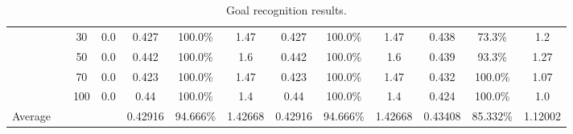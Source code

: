 \documentclass[letterpaper]{article}
\begin{document}
\begin{table*}[]
\begin{tabular}{|c|c|cc|ccc|ccc|ccc|}
	\\ & & 30	 & 0.0

		& 0.427 & 100.0\% & 1.47 	 

		& 0.427 & 100.0\% & 1.47 	 

		& 0.438 & 73.3\% & 1.2 	 

	\\ & & 50	 & 0.0

		& 0.442 & 100.0\% & 1.6 	 

		& 0.442 & 100.0\% & 1.6 	 

		& 0.439 & 93.3\% & 1.27 	 

	\\ & & 70	 & 0.0

		& 0.423 & 100.0\% & 1.47 	 

		& 0.423 & 100.0\% & 1.47 	 

		& 0.432 & 100.0\% & 1.07 	 

	\\ & & 100	 & 0.0

		& 0.44 & 100.0\% & 1.4 	 

		& 0.44 & 100.0\% & 1.4 	 

		& 0.424 & 100.0\% & 1.0 	 
 \\ \hline

Average & & & & 0.42916 & 94.666\% & 1.42668 & 0.42916 & 94.666\% & 1.42668 & 0.43408 & 85.332\% & 1.12002
 
\\ \hline

\end{tabular}
\caption{Goal recognition results.}
\label{tab:goalRecognitionResults}
\end{table*}
\end{document}
